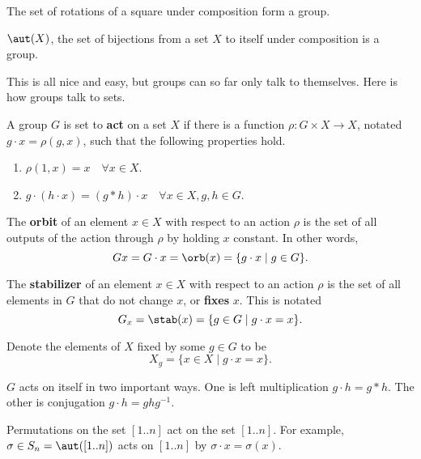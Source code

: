 \documentclass{article}
\begin{document}
\begin{ex}
The set of rotations of a square under composition form a group.
\end{ex}

\begin{ex}
$\aut(X)$, the set of bijections from a set $X$ to itself under
composition is a group.
\end{ex}

This is all nice and easy, but groups can so far only talk to
themselves. Here is how groups talk to sets.

\begin{df}
A group $G$ is set to \textbf{act} on a set $X$ if there is a function
$\rho : G \times X \to X$, notated $g \cdot x = \rho(g, x)$, such that
the following properties hold.
\begin{enumerate}
\item $\rho(1, x) = x \quad \forall x \in X$.
\item $g \cdot (h \cdot x) = (g * h) \cdot x \quad \forall x \in X, g, h
\in G$.
\end{enumerate}
\end{df}

\begin{df}
The \textbf{orbit} of an element $x \in X$ with respect to an action
$\rho$ is the set of all outputs of the action through $\rho$ by holding
$x$ constant. In other words,
\[ Gx = G \cdot x = \orb(x) = \lbrace g \cdot x \mid g \in G \rbrace. \]
\end{df}

\begin{df}
The \textbf{stabilizer} of an element $x \in X$ with respect to an
action $\rho$ is the set of all elements in $G$ that do not change $x$,
or \textbf{fixes} $x$. This is notated
\[ G_x = \stab(x) = \lbrace g \in G \mid g \cdot x = x \rbrace. \]
\end{df}

\begin{df}
Denote the elements of $X$ fixed by some $g \in G$ to be
\[ X_g = \lbrace x \in X \mid g \cdot x = x \rbrace. \]
\end{df}

\begin{ex}
$G$ acts on itself in two important ways. One is left multiplication $g
\cdot h = g * h$. The other is conjugation $g \cdot h = ghg^{-1}$.
\end{ex}

\begin{ex}
Permutations on the set $[1..n]$ act on the set $[1..n]$. For example,
$\sigma \in S_n = \aut([1..n])$ acts on $[1..n]$ by $\sigma \cdot x =
\sigma(x)$.
\end{ex}
\end{document}
